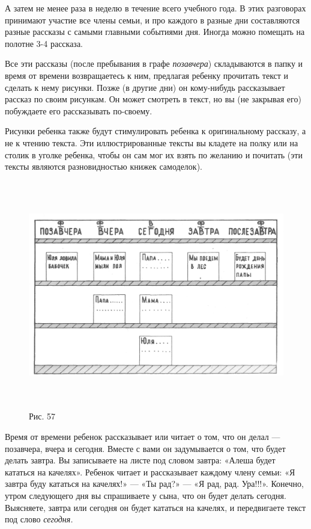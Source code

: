 \documentclass{book}
\renewcommand{\emph}[1]{\textit{#1}}
\begin{document}
А затем не менее раза в неделю в течение всего учебного года. В этих
разговорах принимают участие все члены семьи, и про каждого в разные дни
составляются разные рассказы с самыми главными событиями дня. Иногда
можно помещать на полотне 3-4 рассказа.

Все эти рассказы (после пребывания в графе \emph{позавчера})
складываются в папку и время от времени возвращаетесь к ним, предлагая
ребенку прочитать текст и сделать к нему рисунки. Позже (в другие дни)
он кому-нибудь рассказывает рассказ по своим рисункам. Он может смотреть
в текст, но вы (не закрывая его) побуждаете его рассказывать по-своему.

Рисунки ребенка также будут стимулировать ребенка к оригинальному
рассказу, а не к чтению текста. Эти иллюстрированные тексты вы кладете
на полку или на столик в уголке ребенка, чтобы он сам мог их взять по
желанию и почитать (эти тексты являются разновидностью книжек
самоделок).

\begin{figure}
\centering
\includegraphics[width=6.02917in,height=3.92799in]{media/media/image54.jpg}
\caption*{Рис. 57}
\end{figure}

Время от времени ребенок рассказывает или читает о том, что он делал ---
позавчера, вчера и сегодня. Вместе с вами он задумывается о том, что
будет делать завтра. Вы записываете на листе под словом завтра: «Алеша
будет кататься на качелях». Ребенок читает и рассказывает каждому члену
семьи: «Я завтра буду кататься на качелях!» --- «Ты рад?» --- «Я рад,
рад. Ура!!!». Конечно, утром следующего дня вы спрашиваете у сына, что
он будет делать сегодня. Выясняете, завтра или сегодня он будет кататься
на качелях, и передвигаете текст под слово \emph{сегодня.}
\end{document}
